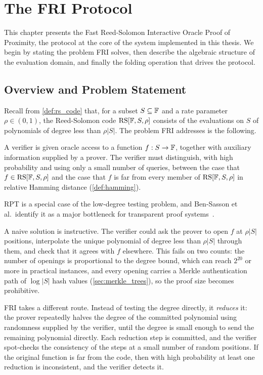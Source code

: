 \chapter{The FRI Protocol}
\label{ch:fri}
 
This chapter presents the Fast Reed-Solomon Interactive Oracle Proof of
Proximity, the protocol at the core of the system implemented in
this thesis. We begin by stating the problem FRI solves, then describe
the algebraic structure of the evaluation domain, and finally the
folding operation that drives the protocol.

\section{Overview and Problem Statement}
\label{sec:fri_overview}

 
Recall from \cref{def:rs_code} that, for a subset $S \subseteq \mathbb{F}$ and
a rate parameter $\rho \in (0,1)$, the Reed-Solomon code
$\mathrm{RS}[\mathbb{F}, S, \rho]$ consists of the evaluations on $S$ of polynomials of
degree less than $\rho|S|$. The problem FRI addresses is the following.
 
\begin{definition}
\label{def:rpt}
A verifier is given oracle access to a function $f : S \to \mathbb{F}$, together
with auxiliary information supplied by a prover. The verifier must
distinguish, with high probability and using only a small number of
queries, between the case that $f \in \mathrm{RS}[\mathbb{F}, S, \rho]$ and the case
that $f$ is far from every member of $\mathrm{RS}[\mathbb{F}, S, \rho]$ in relative
Hamming distance (\cref{def:hamming}).
\end{definition}
 
RPT is a special case of the low-degree testing problem, and
Ben-Sasson et al.\ identify it as a major bottleneck for transparent
proof systems~\cite[Section~2.1]{BBHR18}.
 
A naive solution is instructive. The verifier could ask the prover to
open $f$ at $\rho|S|$ positions, interpolate the unique polynomial of
degree less than $\rho|S|$ through them, and check that it agrees with
$f$ elsewhere. This fails on two counts: the number of openings is
proportional to the degree bound, which can reach $2^{20}$ or more in
practical instances, and every opening carries a Merkle authentication
path of $\log|S|$ hash values (\cref{sec:merkle_trees}), so the proof
size becomes prohibitive.
 
FRI takes a different route. Instead of testing the degree directly,
it \emph{reduces} it: the prover repeatedly halves the degree of the
committed polynomial using randomness supplied by the verifier, until
the degree is small enough to send the remaining polynomial directly.
Each reduction step is committed, and the verifier spot-checks the
consistency of the steps at a small number of random positions. If the
original function is far from the code, then with high probability at
least one reduction is inconsistent, and the verifier detects it.
 
